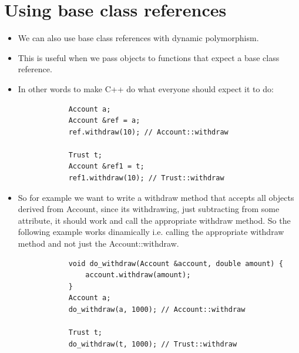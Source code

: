 \section{Using base class references}
\begin{itemize}
    \item We can also use base class references with dynamic polymorphism. 
    \item This is useful when we pass objects to functions that expect a base class reference.
    \item In other words to make C++ do what everyone should expect it to do:
        \begin{verbatim}
            Account a;
            Account &ref = a;
            ref.withdraw(10); // Account::withdraw

            Trust t;
            Account &ref1 = t;
            ref1.withdraw(10); // Trust::withdraw
        \end{verbatim}
    
    \item So for example we want to write a withdraw method that accepts all objects derived from Account, since its withdrawing, just subtracting from some attribute, it should work and call the appropriate withdraw method. So the following example works dinamically i.e. calling the appropriate withdraw method and not just the Account::withdraw.
        \begin{verbatim}
            void do_withdraw(Account &account, double amount) {
                account.withdraw(amount);
            }
            Account a;
            do_withdraw(a, 1000); // Account::withdraw

            Trust t; 
            do_withdraw(t, 1000); // Trust::withdraw
        \end{verbatim}
\end{itemize}

